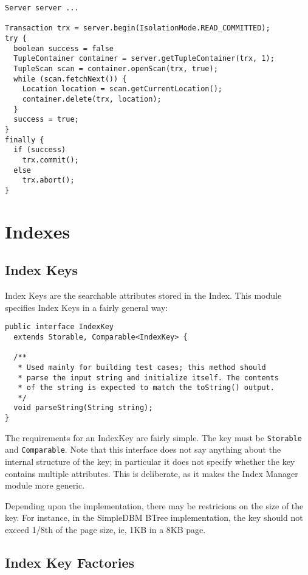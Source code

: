 \documentclass[a4paper,draft,oneside]{book}
\begin{document}
\begin{verbatim}
Server server ...

Transaction trx = server.begin(IsolationMode.READ_COMMITTED);
try {
  boolean success = false      
  TupleContainer container = server.getTupleContainer(trx, 1);
  TupleScan scan = container.openScan(trx, true);
  while (scan.fetchNext()) {
    Location location = scan.getCurrentLocation();
    container.delete(trx, location);
  }
  success = true;
}
finally {
  if (success)
    trx.commit();
  else
    trx.abort();
}
\end{verbatim}

\chapter{Indexes}
\label{sec:indexes}

\section{Index Keys}

Index Keys are the searchable attributes stored in the Index. This module
specifies Index Keys in a fairly general way:

\begin{verbatim}
public interface IndexKey 
  extends Storable, Comparable<IndexKey> {
	
  /**
   * Used mainly for building test cases; this method should
   * parse the input string and initialize itself. The contents 
   * of the string is expected to match the toString() output.
   */
  void parseString(String string);
}
\end{verbatim}

The requirements for an IndexKey are fairly simple. The key must be
\verb|Storable| and \verb|Comparable|. Note that this interface does
not say anything about the internal structure of the key; in
particular it does not specify whether the key contains multiple
attributes. This is deliberate, as it makes the Index Manager module
more generic.

Depending upon the implementation, there may be restricions on the
size of the key. For instance, in the SimpleDBM BTree implementation,
the key should not exceed 1/8th of the page size, ie, 1KB in a 8KB
page.

\section{Index Key Factories}
\end{document}
